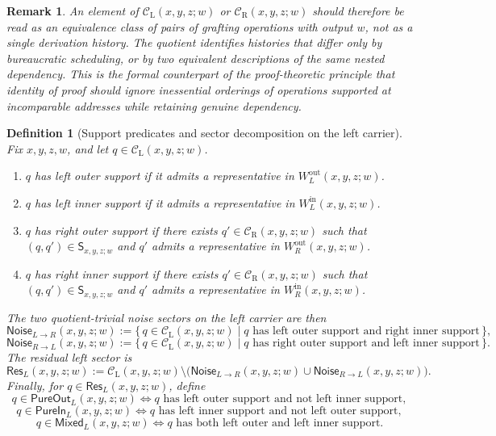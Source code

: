 \documentclass[11pt]{article}
\newtheorem{definition}[theorem]{Definition}
\newtheorem{remark}[theorem]{Remark}
\newcommand{\CL}{\mathcal{C}_{\mathrm{L}}}
\newcommand{\CR}{\mathcal{C}_{\mathrm{R}}}
\newcommand{\Swap}{\mathsf{S}}
\newcommand{\Noise}{\mathsf{Noise}}
\newcommand{\Res}{\mathsf{Res}}
\newcommand{\PureOut}{\mathsf{PureOut}}
\newcommand{\PureIn}{\mathsf{PureIn}}
\begin{document}
\begin{remark}
An element of \(\CL(x,y,z;w)\) or \(\CR(x,y,z;w)\) should therefore be read as
an equivalence class of \emph{pairs of grafting operations} with output \(w\),
not as a single derivation history. The quotient identifies histories that
differ only by bureaucratic scheduling, or by two equivalent descriptions of
the same nested dependency. This is the formal counterpart of the
proof-theoretic principle that identity of proof should ignore inessential
orderings of operations supported at incomparable addresses while retaining
genuine dependency.
\end{remark}

\begin{definition}[Support predicates and sector decomposition on the left carrier]
Fix \(x,y,z,w\), and let \(q\in \CL(x,y,z;w)\).
\begin{enumerate}[label=\textup{(\roman*)}]
\item \(q\) has \emph{left outer support} if it admits a representative in
\(W^{\mathrm{out}}_L(x,y,z;w)\).
\item \(q\) has \emph{left inner support} if it admits a representative in
\(W^{\mathrm{in}}_L(x,y,z;w)\).
\item \(q\) has \emph{right outer support} if there exists
\(q'\in \CR(x,y,z;w)\) such that \((q,q')\in \Swap_{x,y,z;w}\) and \(q'\) admits
a representative in \(W^{\mathrm{out}}_R(x,y,z;w)\).
\item \(q\) has \emph{right inner support} if there exists
\(q'\in \CR(x,y,z;w)\) such that \((q,q')\in \Swap_{x,y,z;w}\) and \(q'\) admits
a representative in \(W^{\mathrm{in}}_R(x,y,z;w)\).
\end{enumerate}
The two quotient-trivial noise sectors on the left carrier are then
\[
\Noise_{L\to R}(x,y,z;w)
:=
\{\,q\in \CL(x,y,z;w)\mid
\text{$q$ has left outer support and right inner support}\,\},
\]
\[
\Noise_{R\to L}(x,y,z;w)
:=
\{\,q\in \CL(x,y,z;w)\mid
\text{$q$ has right outer support and left inner support}\,\}.
\]
The \emph{residual left sector} is
\[
\Res_L(x,y,z;w)
:=
\CL(x,y,z;w)\setminus
\bigl(\Noise_{L\to R}(x,y,z;w)\cup \Noise_{R\to L}(x,y,z;w)\bigr).
\]
Finally, for \(q\in \Res_L(x,y,z;w)\), define
\[
q\in \PureOut_L(x,y,z;w)
\iff
\text{$q$ has left outer support and not left inner support},
\]
\[
q\in \PureIn_L(x,y,z;w)
\iff
\text{$q$ has left inner support and not left outer support},
\]
\[
q\in \mathsf{Mixed}_L(x,y,z;w)
\iff
\text{$q$ has both left outer and left inner support}.
\]
\end{definition}
\end{document}
